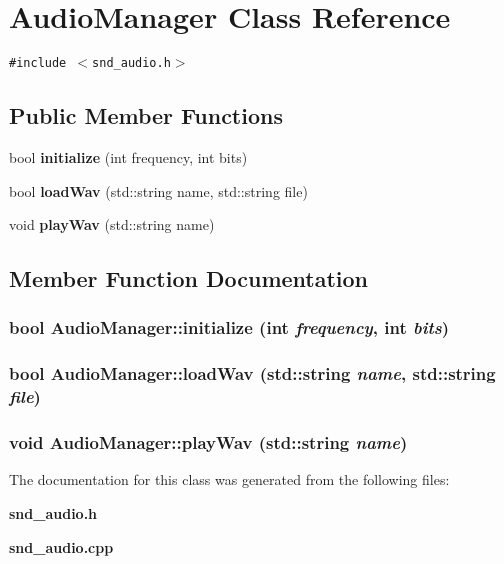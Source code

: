 \section{AudioManager Class Reference}
\label{classAudioManager}
{\tt \#include $<$snd\_\-audio.h$>$}

\subsection*{Public Member Functions}
\begin{CompactItemize}
\item 
bool {\bf initialize} (int frequency, int bits)
\item 
bool {\bf loadWav} (std::string name, std::string file)
\item 
void {\bf playWav} (std::string name)
\end{CompactItemize}


\subsection{Member Function Documentation}
\subsubsection{\setlength{\rightskip}{0pt plus 5cm}bool AudioManager::initialize (int {\em frequency}, int {\em bits})}\label{classAudioManager_dd968389459bf28f92d8956e78be7a1e}


\subsubsection{\setlength{\rightskip}{0pt plus 5cm}bool AudioManager::loadWav (std::string {\em name}, std::string {\em file})}\label{classAudioManager_859717837ac93f1e8b5c3effd3daf990}


\subsubsection{\setlength{\rightskip}{0pt plus 5cm}void AudioManager::playWav (std::string {\em name})}\label{classAudioManager_2edd0bcfd7de0348932fa0f24420f4ba}




The documentation for this class was generated from the following files:\begin{CompactItemize}
\item 
{\bf snd\_\-audio.h}\item 
{\bf snd\_\-audio.cpp}\end{CompactItemize}
